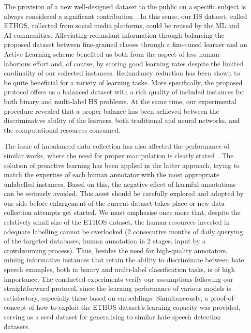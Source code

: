 \documentclass{article}
\begin{document}
The provision of a new well-designed dataset to the public on a specific subject is always considered a significant contribution~\cite{DBLP:conf/cikm/HoangVN18,DBLP:conf/cikm/SunAJHS19}. In this sense, our HS dataset, called ETHOS, collected from social media platforms, could be reused by the ML and AI communities. Alleviating redundant information through balancing the proposed dataset between fine-grained classes through a fine-tuned learner and an Active Learning scheme benefited us both from the aspect of less human-laborious effort and, of course, by scoring good learning rates despite the limited cardinality of our collected instances. Redundancy reduction has been shown to be quite beneficial for a variety of learning tasks. More specifically, the proposed protocol offers us a balanced dataset with a rich quality of included instances for both binary and multi-label HS problems. At the same time, our experimental procedure revealed that a proper balance has been achieved between the discriminative ability of the learners, both traditional and neural networks, and the computational resources consumed.

The issue of imbalanced data collection has also affected the performance of similar works, where the need for proper manipulation is clearly stated~\cite{DBLP:conf/lrec/HaagsmaBN20,DBLP:conf/eacl/NghiemBA21}. The solution of proactive learning has been applied in the latter approach, trying to match the expertise of each human annotator with the most appropriate unlabelled instances. Based on this, the negative effect of harmful annotations can be seriously avoided. This asset should be carefully explored and adopted by our side before enlargement of the current dataset takes place or new data collection attempts get started. We must emphasise once more that, despite the relatively small size of the ETHOS dataset, the human resources invested in adequate labelling cannot be overlooked (2 consecutive months of daily querying of the targeted databases, human annotation in 2 stages, input by a crowdsourcing process). Thus, besides the need for high-quality annotators, mining informative instances that retain the ability to discriminate between hate speech examples, both in binary and multi-label classification tasks, is of high importance. The conducted experiments verify our assumptions following our straightforward protocol, since the learning performance of various models is satisfactory, especially these based on embeddings. Simultaneously, a proof-of-concept of how to exploit the ETHOS dataset's learning capacity was provided, serving as a seed dataset for generalising to similar hate speech detection datasets.
\end{document}
